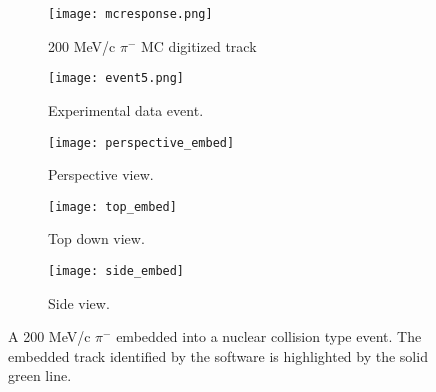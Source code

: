 
\begin{figure}[!htb]
    \centering
    \begin{subfigure}[t]{0.49\textwidth}
        \centering
        \texttt{[image: mcresponse.png]}
        \caption{200 MeV/c $\pi^-$ MC digitized track} \label{fig:mcevent}
    \end{subfigure}
    \hfill
    \begin{subfigure}[t]{.49\textwidth}
        \centering
        \texttt{[image: event5.png]} 
        \caption{Experimental data event.} \label{fig:dataevent}
    \end{subfigure}
    \caption{}
\label{fig:embedtrack}
\end{figure}



\begin{figure}[!htb]
    \centering
    \begin{subfigure}[t]{0.49\textwidth}
        \centering
        \texttt{[image: perspective\_embed]}
        \caption{Perspective view.} \label{fig:persEmbed}
    \end{subfigure}
    \hfill
    \begin{subfigure}[t]{.3\textwidth}
        \centering
        \texttt{[image: top\_embed]} 
        \caption{Top down view.} \label{fig:topEmbed}
    \end{subfigure}
     \hfill
    \begin{subfigure}[t]{\textwidth}
        \centering
        \texttt{[image: side\_embed]} 
        \caption{Side view.} \label{fig:sideEmbed}
    \end{subfigure}
    \caption{A 200 MeV/c $\pi^-$ embedded into a nuclear collision type event. The embedded track identified by the software is highlighted by the solid green line. }

\label{fig:embedtrack}
\end{figure}


